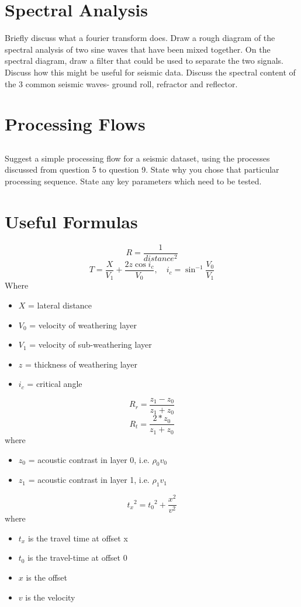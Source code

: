\section{Spectral Analysis}
Briefly discuss what a fourier transform does.  Draw a rough diagram of the spectral analysis of two sine waves that have been mixed together.  On the spectral diagram, draw a filter that could be used to separate the two signals.  Discuss how this might be useful for seismic data.  Discuss the spectral content of the 3 common seismic waves- ground roll, refractor and reflector.
\section{Processing Flows}
\subsection{}
Suggest a simple processing flow for a seismic dataset, using the processes discussed from question 5 to question 9.  State why you chose that particular processing sequence.  State any key parameters which need to be tested.

\newpage
\section{Useful Formulas}
\[R = \frac{1}{distance^2}\]
\[T = \frac{X}{V_1} + \frac{2z \cos{i_c}}{V_0}, \quad i_c = \sin^{-1}{\frac{V_0}{V_1}} \]
Where
\begin{itemize}
\item $X$ = lateral distance
\item $V_0$ = velocity of weathering layer
\item $V_1$ = velocity of sub-weathering layer
\item $z$ = thickness of weathering layer
\item $i_c$ = critical angle
\end{itemize}

\[ R_r = \frac{z_1 - z_0}{z_1+z_0}\]
\[ R_t = \frac{2*z_0}{z_1+z_0}\]
where 
\begin{itemize}
\item $z_0$  = acoustic contrast in layer 0, i.e. $\rho_0 v_0$
\item $z_1$ = acoustic contrast in layer 1, i.e. $\rho_1 v_1$
\end{itemize}

\[ {t_x}^2 = {t_0}^2 + \frac{x^2}{v^2}\]
where
\begin{itemize}
\item $t_x$ is the travel time at offset x
\item $t_0$ is the travel-time at offset 0
\item $x$ is the offset
\item $v$ is the velocity
\end{itemize}

